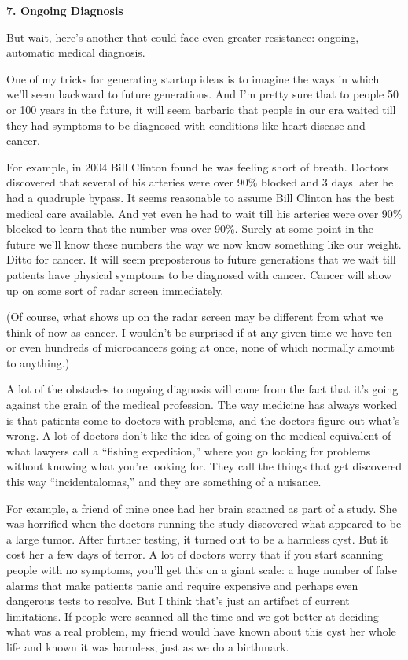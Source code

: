 \textbf{7. Ongoing Diagnosis}

But wait, here's another that could face even greater resistance:
ongoing, automatic medical diagnosis.

One of my tricks for generating startup ideas is to imagine the ways in
which we'll seem backward to future generations. And I'm pretty sure
that to people 50 or 100 years in the future, it will seem barbaric that
people in our era waited till they had symptoms to be diagnosed with
conditions like heart disease and cancer.

For example, in 2004 Bill Clinton found he was feeling short of breath.
Doctors discovered that several of his arteries were over 90\% blocked
and 3 days later he had a quadruple bypass. It seems reasonable to
assume Bill Clinton has the best medical care available. And yet even he
had to wait till his arteries were over 90\% blocked to learn that the
number was over 90\%. Surely at some point in the future we'll know
these numbers the way we now know something like our weight. Ditto for
cancer. It will seem preposterous to future generations that we wait
till patients have physical symptoms to be diagnosed with cancer. Cancer
will show up on some sort of radar screen immediately.

(Of course, what shows up on the radar screen may be different from what
we think of now as cancer. I wouldn't be surprised if at any given time
we have ten or even hundreds of microcancers going at once, none of
which normally amount to anything.)

A lot of the obstacles to ongoing diagnosis will come from the fact that
it's going against the grain of the medical profession. The way medicine
has always worked is that patients come to doctors with problems, and
the doctors figure out what's wrong. A lot of doctors don't like the
idea of going on the medical equivalent of what lawyers call a ``fishing
expedition,'' where you go looking for problems without knowing what
you're looking for. They call the things that get discovered this way
``incidentalomas,'' and they are something of a nuisance.

For example, a friend of mine once had her brain scanned as part of a
study. She was horrified when the doctors running the study discovered
what appeared to be a large tumor. After further testing, it turned out
to be a harmless cyst. But it cost her a few days of terror. A lot of
doctors worry that if you start scanning people with no symptoms, you'll
get this on a giant scale: a huge number of false alarms that make
patients panic and require expensive and perhaps even dangerous tests to
resolve. But I think that's just an artifact of current limitations. If
people were scanned all the time and we got better at deciding what was
a real problem, my friend would have known about this cyst her whole
life and known it was harmless, just as we do a birthmark.

